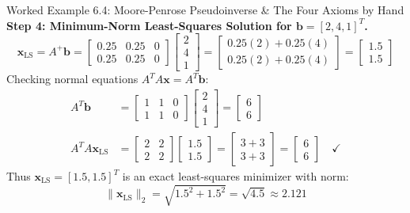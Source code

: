 \begin{examplebox}[breakable]{Worked Example 6.4: Moore-Penrose Pseudoinverse \& The Four Axioms by Hand}
\textbf{Step 4: Minimum-Norm Least-Squares Solution for $\mathbf{b} = [2, 4, 1]^T$.}
\begin{equation}
\mathbf{x}_{\text{LS}} = A^+ \mathbf{b} = \begin{bmatrix} 0.25 & 0.25 & 0 \\ 0.25 & 0.25 & 0 \end{bmatrix} \begin{bmatrix} 2 \\ 4 \\ 1 \end{bmatrix} = \begin{bmatrix} 0.25(2) + 0.25(4) \\ 0.25(2) + 0.25(4) \end{bmatrix} = \begin{bmatrix} 1.5 \\ 1.5 \end{bmatrix}
\end{equation}
Checking normal equations $A^T A \mathbf{x} = A^T \mathbf{b}$:
\begin{align}
A^T \mathbf{b} &= \begin{bmatrix} 1 & 1 & 0 \\ 1 & 1 & 0 \end{bmatrix} \begin{bmatrix} 2 \\ 4 \\ 1 \end{bmatrix} = \begin{bmatrix} 6 \\ 6 \end{bmatrix} \\
A^T A \mathbf{x}_{\text{LS}} &= \begin{bmatrix} 2 & 2 \\ 2 & 2 \end{bmatrix} \begin{bmatrix} 1.5 \\ 1.5 \end{bmatrix} = \begin{bmatrix} 3 + 3 \\ 3 + 3 \end{bmatrix} = \begin{bmatrix} 6 \\ 6 \end{bmatrix} \quad \checkmark
\end{align}
Thus $\mathbf{x}_{\text{LS}} = [1.5, 1.5]^T$ is an exact least-squares minimizer with norm:
\begin{equation}
\|\mathbf{x}_{\text{LS}}\|_2 = \sqrt{1.5^2 + 1.5^2} = \sqrt{4.5} \approx 2.121

\end{equation}
\end{examplebox}
